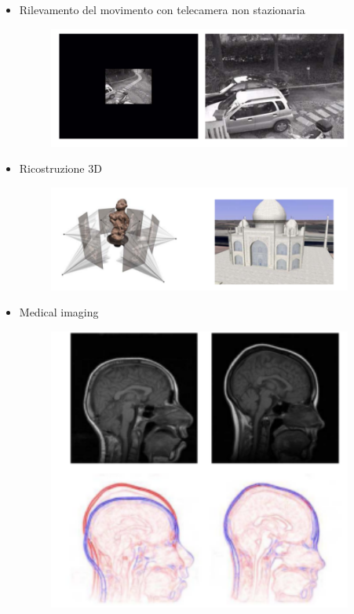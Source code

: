 \begin{itemize}
    \item Rilevamento del movimento con telecamera non stazionaria

          \begin{figure}[H]
              \centering
              \includegraphics[width=10cm, keepaspectratio]{capitoli/immagini/imgs/image-registration-applicazioni.png}
          \end{figure}

    \item Ricostruzione 3D

          \begin{figure}[H]
              \centering
              \includegraphics[width=10cm, keepaspectratio]{capitoli/immagini/imgs/ricostruzione-3-d.png}
          \end{figure}
    \item Medical imaging
          \begin{figure}[H]
              \centering
              \includegraphics[width=10cm, keepaspectratio]{capitoli/immagini/imgs/medical-imaging.png}
          \end{figure}
\end{itemize}


